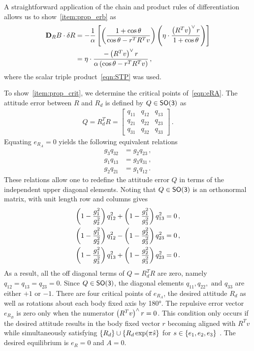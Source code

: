 \documentclass[letterpaper, 10 pt, conference]{ieeeconf}  %
\begin{document}
A straightforward application of the chain and product rules of differentiation allows us to show~\cref{item:prop_erb} as
\begin{align*}
	\mathbf{D}_{R} B \cdot \delta R &= -\frac{1}{\alpha} \left[\left(\frac{1+\cos \theta}{\cos \theta - r^T R^T v} \right) \left(\eta \cdot \frac{\left( R^T v\right)^\vee r}{1+\cos \theta} \right) \right]  \\
	&= \eta \cdot \frac{ - \left( R^T v\right)^\vee r}{\alpha \left(\cos \theta - r^T R^T v \right)} \, ,
\end{align*}
where the scalar triple product~\cref{eqn:STP} was used.

To show~\cref{item:prop_crit}, we determine the critical points of~\cref{eqn:eRA}.
The attitude error between \( R \) and \( R_d \) is defined by \( Q \in \mathsf{SO(3)} \) as
\begin{align*}
	Q = R_d^T R = 
	\begin{bmatrix}
		q_{11} & q_{12} & q_{13} \\
		q_{21} & q_{22} & q_{23} \\
		q_{31} & q_{32} & q_{33}
	\end{bmatrix} \, .
\end{align*}
Equating \( e_{R_{A}} = 0 \) yields the following equivalent relations
\begin{subequations}
\begin{align}
	g_3 q_{32} &= g_2 q_{23} \, , \\
	g_1 q_{13} &= g_3 q_{31} \, , \\
	g_2 q_{21} &= g_1 q_{12} \, .
\end{align}
\end{subequations}
These relations allow one to redefine the attitude error \( Q \) in terms of the independent upper diagonal elements.
Noting that \( Q \in \mathsf{SO(3)} \) is an orthonormal matrix, with unit length row and columns gives
\begin{subequations}
\begin{align}
	\left( 1 - \frac{g_1^2}{g_2^2} \right) q_{12}^2 + \left( 1 - \frac{g_1^2}{g_3^2} \right)q_{13}^2 &= 0 \, , \\
	\left( 1 - \frac{g_1^2}{g_2^2} \right) q_{12}^2 - \left( 1 - \frac{g_2^2}{g_3^2} \right) q_{23}^2 &= 0 \, , \\
	\left( 1-\frac{g_1^2}{g_3^2} \right) q_{13}^2 + \left( 1 - \frac{g_2^2}{g_3^2} \right) q_{23}^2 &= 0 \, .
\end{align}
\end{subequations}
As a result, all the off diagonal terms of \( Q = R_d^T R \) are zero, namely \( q_{12}= q_{13} = q_{23} = 0 \).
Since \( Q \in \mathsf{SO(3)} \), the diagonal elements \( q_{11}, q_{22}, \text{ and } q_{33} \) are either \( +1 \) or \(-1\).
There are four critical points of \( e_{R_A} \), the desired attitude \( R_d \) as well as rotations about each body fixed axis by \ang{180}.
The repulsive error vector \( e_{R_{B}} \) is zero only when the numerator \( \left( R^T v \right)^\wedge r = 0 \). 
This condition only occurs if the desired attitude results in the body fixed vector \( r \) becoming aligned with \(R^T v \) while simultaneously satisfying \(\left\{ R_d \right\} \cup \left\{ R_d \exp(\pi \hat{s} \right\} \) for \( s \in \left\{ e_1, e_2, e_3 \right\} \) .
The desired equilibrium is \( e_R = 0 \) and \( A = 0\).
\end{document}

